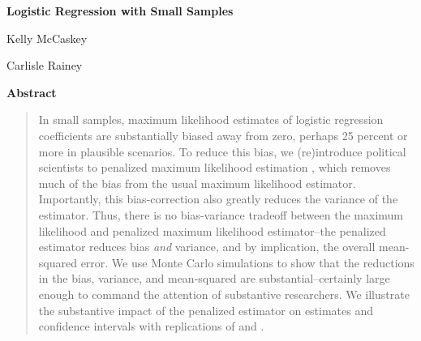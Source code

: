 \documentclass[12pt]{article}
\begin{document}
\begin{center}
{\LARGE{\textbf{Logistic Regression with Small Samples}}}\\\vspace{2mm}

\vspace{10mm}

Kelly McCaskey

\vspace{3mm}

Carlisle Rainey
\end{center}

\vspace{10mm}

{\centerline{\textbf{Abstract}}}
\begin{quote}\noindent
In small samples, maximum likelihood estimates of logistic regression coefficients are substantially biased away from zero, perhaps 25 percent or more in plausible scenarios. 
To reduce this bias, we (re)introduce political scientists to penalized maximum likelihood estimation \citep{Firth1993}, which removes much of the bias from the usual maximum likelihood estimator. 
Importantly, this bias-correction also greatly reduces the variance of the estimator.
Thus, there is no bias-variance tradeoff between the maximum likelihood and penalized maximum likelihood estimator--the penalized estimator reduces bias \textit{and} variance, and by implication, the overall mean-squared error.
We use Monte Carlo simulations to show that the reductions in the bias, variance, and mean-squared are substantial--certainly large enough to command the attention of substantive researchers.
We illustrate the substantive impact of the penalized estimator on estimates and confidence intervals with replications of \cite{Weisiger2014} and \cite{GeorgeEpstein1992}.
 \end{quote}
 
\end{document}
